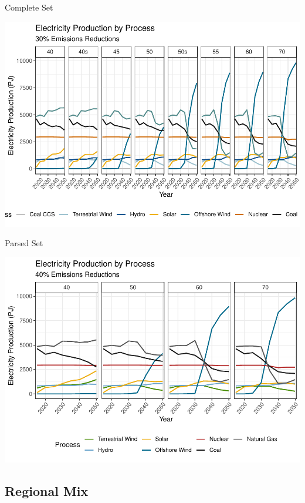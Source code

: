 \documentclass[]{article}
\begin{document}
Complete Set

\includegraphics{osw_Report_files/figure-latex/unnamed-chunk-24-1.pdf}

Parsed Set

\includegraphics{osw_Report_files/figure-latex/unnamed-chunk-25-1.pdf}

\hypertarget{regional-mix}{%
\subsection{Regional Mix}\label{regional-mix}}
\end{document}
